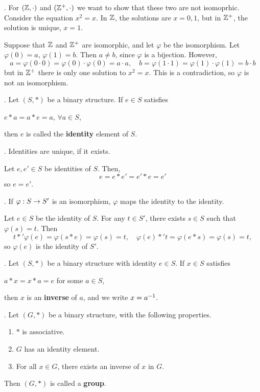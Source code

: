 \ex. For \((\mathbb{Z}, \cdot)\) and \((\mathbb{Z}^+, \cdot)\) we want to show that these two are not isomoprhic. Consider the equation \(x^2 = x\). In \(\mathbb{Z}\), the solutions are \(x = 0, 1\), but in \(\mathbb{Z}^+\), the solution is unique, \(x = 1\).

\pf Suppose that \(\mathbb{Z}\) and \(\mathbb{Z}^+\) are isomorphic, and let \(\varphi\) be the isomorphism. Let \(\varphi(0) = a\), \(\varphi(1) = b\). Then \(a \neq b\), since \(\varphi\) is a bijection. However,
\[
    a = \varphi(0 \cdot 0) = \varphi(0) \cdot \varphi(0) = a \cdot a, \quad
    b = \varphi(1 \cdot 1) = \varphi(1) \cdot \varphi(1) = b \cdot b
\]
but in \(\mathbb{Z}^+\) there is only one solution to \(x^2 = x\). This is a contradiction, so \(\varphi\) is not an isomorphism.

.  Let \((S, *)\) be a binary structure. If \(e \in S\) satisfies
\begin{center}
    \(e * a = a * e = a\), \quad \(\forall a \in S\),
\end{center}
then \(e\) is called the \textbf{identity} element of \(S\).

\thm. Identities are unique, if it exists.

\pf Let \(e, e' \in S\) be identities of \(S\). Then,
\[
    e = e * e' = e' * e = e'
\]
so \(e = e'\).

\thm. If \(\varphi: S \rightarrow S'\) is an isomorphism, \(\varphi\) maps the identity to the identity.

\pf Let \(e \in S\) be the identity of \(S\). For any \(t \in S'\), there exists \(s \in S\) such that \(\varphi(s) = t\). Then
\[
    t *' \varphi(e) = \varphi(s * e) = \varphi(s) = t, \quad
    \varphi(e) *' t = \varphi(e * s) = \varphi(s) = t,
\]
so \(\varphi(e)\) is the identity of \(S'\).


.  Let \((S, *)\) be a binary structure with identity \(e \in S\). If \(x \in S\) satisfies
\begin{center}
    \(a * x = x * a = e\) for some \(a \in S\),
\end{center}
then \(x\) is an \textbf{inverse} of \(a\), and we write \(x = a^{-1}\).

.  Let \((G, *)\) be a binary structure, with the following properties.
\begin{enumerate}
    \item \(*\) is associative.
    \item \(G\) has an identity element.
    \item For all \(x \in G\), there exists an inverse of \(x\) in \(G\).
\end{enumerate}
Then \((G, *)\) is called a \textbf{group}.
\pagebreak
